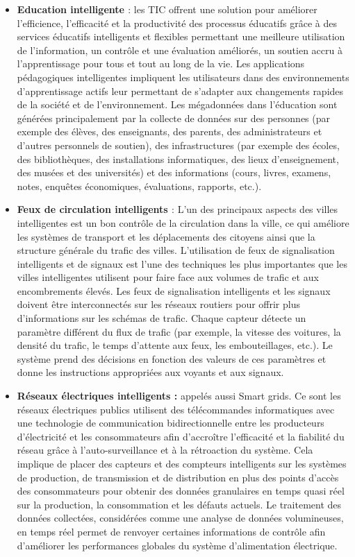 \documentclass[french, a4paper, 12pt]{report}
\begin{document}
\begin{itemize}
\item \textbf{Education intelligente \cite{6}} : les TIC offrent une solution pour améliorer l'efficience, l'efficacité et la productivité des processus éducatifs grâce à des services éducatifs intelligents et flexibles permettant une meilleure utilisation de l'information, un contrôle et une évaluation améliorés, un soutien accru à l'apprentissage pour tous et tout au long de la vie. Les applications pédagogiques intelligentes impliquent les utilisateurs dans des environnements d’apprentissage actifs leur permettant de s’adapter aux changements rapides de la société et de l’environnement. Les mégadonnées dans l'éducation sont générées principalement par la collecte de données sur des personnes (par exemple des élèves, des enseignants, des parents, des administrateurs et d'autres personnels de soutien), des infrastructures (par exemple des écoles, des bibliothèques, des installations informatiques, des lieux d'enseignement, des musées et des universités) et des informations (cours, livres, examens, notes, enquêtes économiques, évaluations, rapports, etc.). 
\item \textbf{Feux de circulation intelligents \cite{7}} : L’un des principaux aspects des villes intelligentes est un bon contrôle de la circulation dans la ville, ce qui améliore les systèmes de transport et les déplacements des citoyens ainsi que la structure générale du trafic des villes. L'utilisation de feux de signalisation intelligents et de signaux est l'une des techniques les plus importantes que les villes intelligentes utilisent pour faire face aux volumes de trafic et aux encombrements élevés. Les feux de signalisation intelligents et les signaux doivent être interconnectés sur les réseaux routiers pour offrir plus d'informations sur les schémas de trafic. Chaque capteur détecte un paramètre différent du flux de trafic (par exemple, la vitesse des voitures, la densité du trafic, le temps d'attente aux feux, les embouteillages, etc.). Le système prend des décisions en fonction des valeurs de ces paramètres et donne les instructions appropriées aux voyants et aux signaux. 
\item \textbf{Réseaux électriques intelligents :} appelés aussi Smart grids. Ce sont les réseaux électriques publics utilisent des télécommandes informatiques avec une technologie de communication bidirectionnelle entre les producteurs d'électricité et les consommateurs afin d'accroître l'efficacité et la fiabilité du réseau grâce à l'auto-surveillance et à la rétroaction du système. Cela implique de placer des capteurs et des compteurs intelligents sur les systèmes de production, de transmission et de distribution en plus des points d'accès des consommateurs pour obtenir des données granulaires en temps quasi réel sur la production, la consommation et les défauts actuels. Le traitement des données collectées, considérées comme une analyse de données volumineuses, en temps réel permet de renvoyer certaines informations de contrôle afin d'améliorer les performances globales du système d'alimentation électrique.

\end{itemize}
\end{document}
